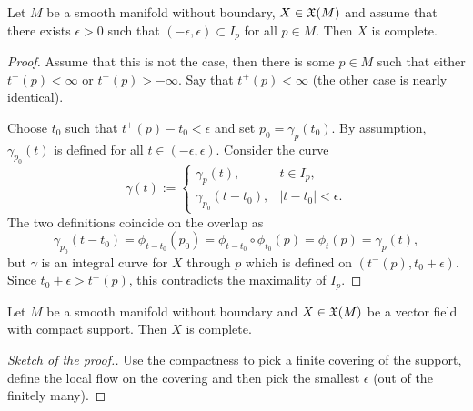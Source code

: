 \begin{lemma}\label{lemma:charactCompleteVF}
	Let $M$ be a smooth manifold without boundary, $X\in\mathfrak{X}(M)$ and assume that there exists $\epsilon >0$ such that $(-\epsilon, \epsilon)\subset I_p$ for all $p \in M$.
	Then $X$ is complete.
\end{lemma}
\begin{proof}
	Assume that this is not the case, then there is some $p\in M$ such that either $t^+(p) < \infty$ or $t^-(p)>-\infty$.
	Say that $t^+(p) < \infty$ (the other case is nearly identical).

	Choose $t_0$ such that $t^+(p) - t_0 < \epsilon$ and set $p_0 = \gamma_p(t_0)$. By assumption, $\gamma_{p_0}(t)$ is defined for all $t\in(-\epsilon, \epsilon)$. Consider the curve
	\begin{equation}
		\gamma(t) := \begin{cases}
			\gamma_p(t),         & t\in I_p,         \\
			\gamma_{p_0}(t-t_0), & |t-t_0|<\epsilon.
		\end{cases}
	\end{equation}
	The two definitions coincide on the overlap as
	\begin{equation}
		\gamma_{p_0}(t-t_0) = \phi_{t-t_0}(p_0) = \phi_{t-t_0}\circ\phi_{t_0}(p) = \phi_t(p) = \gamma_p(t),
	\end{equation}
	but $\gamma$ is an integral curve for $X$ through $p$ which is defined on $(t^-(p), t_0+\epsilon)$.
	Since $t_0 + \epsilon > t^+(p)$, this contradicts the maximality of $I_p$.
\end{proof}

\begin{corollary}
	Let $M$ be a smooth manifold without boundary and $X\in\mathfrak{X}(M)$ be a vector field with compact support. Then $X$ is complete.
\end{corollary}
\begin{proof}[Sketch of the proof.]
	Use the compactness to pick a finite covering of the support, define the local flow on the covering and then pick the smallest $\epsilon$ (out of the finitely many).
\end{proof}

